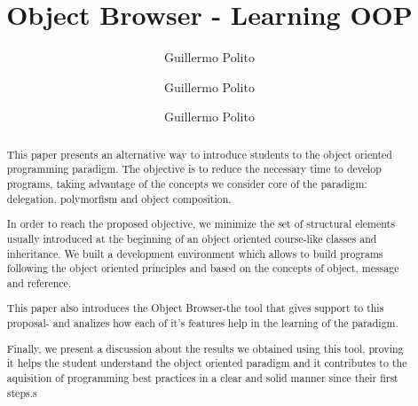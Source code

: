 \documentclass[a4paper, 10pt, english]{article}
\title{Object Browser - Learning OOP}
\author{
        Guillermo Polito \\
        \and
        Guillermo Polito \\
        \and
        Guillermo Polito \\
}
\begin{document}
\maketitle


\begin{abstract}
This paper presents an alternative way to introduce students to the object oriented programming paradigm.  The objective is to reduce the necessary time to develop programs, taking advantage of the concepts we consider core of the paradigm: delegation, polymorfism and object composition.

In order to reach the proposed objective, we minimize the set of structural elements usually introduced at the beginning of an object oriented course-like classes and inheritance.  We built a development environment which allows to build programs following the object oriented principles and based on the concepts of object, message and reference.

This paper also introduces the Object Browser-the tool that gives support to this proposal- and analizes how each of it's features help in the learning of the paradigm.

Finally, we present a discussion about the results we obtained using this tool, proving it helps the student understand the object oriented paradigm and it contributes to the aquisition of programming best practices in a clear and solid manner since their first steps.s
\end{abstract}
\end{document}
